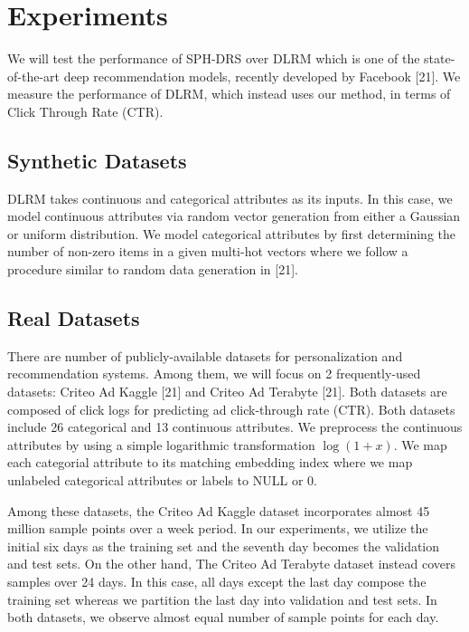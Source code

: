 \documentclass[conference]{IEEEtran}
\begin{document}
\section{Experiments}

We will test the performance of SPH-DRS over DLRM which is one of the state-of-the-art deep recommendation models, recently developed by Facebook [21]. We measure the performance of DLRM, which instead uses our method, in terms of Click Through Rate (CTR).

\subsection{Synthetic Datasets}

DLRM takes continuous and categorical attributes as its inputs. In this case, we model continuous attributes via random vector generation from either a Gaussian or uniform distribution. We model categorical attributes by first determining the number of non-zero items in a given multi-hot vectors where we follow a procedure similar to random data generation in [21].

\subsection{Real Datasets}

There are number of publicly-available datasets for personalization and recommendation systems. Among them, we will focus on 2 frequently-used datasets: Criteo Ad Kaggle [21] and Criteo Ad Terabyte [21]. Both datasets are composed of click logs for predicting ad click-through rate (CTR). Both datasets include 26 categorical and 13 continuous attributes. We preprocess the continuous attributes by using a simple logarithmic transformation $\log (1+x)$. We map each categorial attribute to its matching embedding index where we map unlabeled categorical attributes or labels to NULL or 0.

Among these datasets, the Criteo Ad Kaggle dataset incorporates almost 45 million sample points over a week period. In our experiments, we utilize the initial six days as the training set and the seventh day becomes the validation and test sets. On the other hand, The Criteo Ad Terabyte dataset instead covers samples over 24 days. In this case, all days except the last day compose the training set whereas we partition the last day into validation and test sets. In both datasets, we observe almost equal number of sample points for each day.
\end{document}
